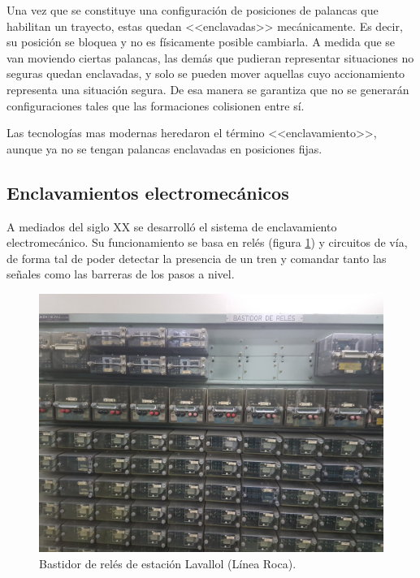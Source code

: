 			Una vez que se constituye una configuración de posiciones de palancas que habilitan un trayecto, estas quedan <<enclavadas>> mecánicamente. Es decir, su posición se bloquea y no es físicamente posible cambiarla. A medida que se van moviendo ciertas palancas, las demás que pudieran representar situaciones no seguras quedan enclavadas, y solo se pueden mover aquellas cuyo accionamiento representa una situación segura. De esa manera se garantiza que no se generarán configuraciones tales que las formaciones colisionen entre sí.
			
			Las tecnologías mas modernas heredaron el término <<enclavamiento>>, aunque ya no se tengan palancas enclavadas en posiciones fijas.
		
		\subsection{Enclavamientos electromecánicos}
			
			A mediados del siglo XX se desarrolló el sistema de enclavamiento electromecánico. Su funcionamiento se basa en relés (figura \ref{fig:Reles}) y circuitos de vía, de forma tal de poder detectar la presencia de un tren y comandar tanto las señales como las barreras de los pasos a nivel.
	
			
			\begin{figure}[htbp!]
				\centering
				\includegraphics[scale=.08]{./Figures/Reles}
				\caption{Bastidor de relés de estación Lavallol (Línea Roca).}
				\label{fig:Reles}
			\end{figure}
		

